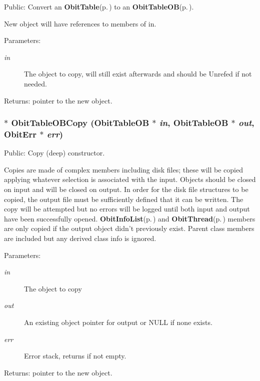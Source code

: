 Public: Convert an {\bf Obit\-Table}{\rm (p.\,\pageref{structObitTable})} to an {\bf Obit\-Table\-OB}{\rm (p.\,\pageref{structObitTableOB})}. 

New object will have references to members of in. \begin{Desc}
\item[Parameters:]
\begin{description}
\item[{\em in}]The object to copy, will still exist afterwards and should be Unrefed if not needed. \end{description}
\end{Desc}
\begin{Desc}
\item[Returns:]pointer to the new object. \end{Desc}
\subsubsection{$\ast$ Obit\-Table\-OBCopy ({\bf Obit\-Table\-OB} $\ast$ {\em in}, {\bf Obit\-Table\-OB} $\ast$ {\em out}, {\bf Obit\-Err} $\ast$ {\em err})}\label{ObitTableOB_8h_a14}


Public: Copy (deep) constructor. 

Copies are made of complex members including disk files; these will be copied applying whatever selection is associated with the input. Objects should be closed on input and will be closed on output. In order for the disk file structures to be copied, the output file must be sufficiently defined that it can be written. The copy will be attempted but no errors will be logged until both input and output have been successfully opened. {\bf Obit\-Info\-List}{\rm (p.\,\pageref{structObitInfoList})} and {\bf Obit\-Thread}{\rm (p.\,\pageref{structObitThread})} members are only copied if the output object didn't previously exist. Parent class members are included but any derived class info is ignored. \begin{Desc}
\item[Parameters:]
\begin{description}
\item[{\em in}]The object to copy \item[{\em out}]An existing object pointer for output or NULL if none exists. \item[{\em err}]Error stack, returns if not empty. \end{description}
\end{Desc}
\begin{Desc}
\item[Returns:]pointer to the new object. \end{Desc}

